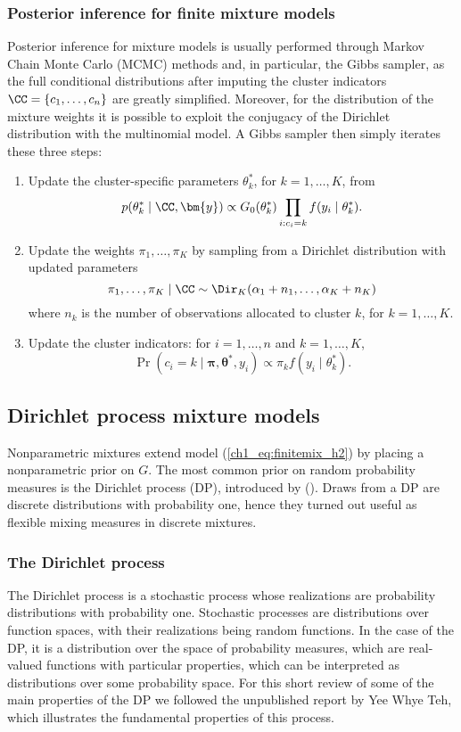 \subsubsection*{Posterior inference for finite mixture models}
Posterior inference for mixture models is usually performed through Markov Chain Monte Carlo (MCMC) methods and, in particular, the Gibbs sampler, as the full conditional distributions after imputing the cluster indicators $\CC = \{c_1,\dots,c_n\}$ are greatly simplified.
Moreover, for the distribution of the mixture weights it is possible to exploit the conjugacy of the Dirichlet distribution with the multinomial model. A Gibbs sampler then simply iterates these three steps:
\begin{enumerate}
	\item Update the cluster-specific parameters $\theta^*_k$, for $k=1,\dots,K$, from
	$$ p(\theta^*_k \mid \CC, \bm{y}) \propto G_0(\theta^*_k) \prod_{i:c_i=k} f(y_i\mid\theta^*_{k}). $$
	\item Update the weights $\pi_1,\dots,\pi_K$ by sampling from a Dirichlet distribution with updated parameters
	$$ \pi_1,\dots,\pi_K\mid \CC \sim  \Dir_K(\alpha_1 + n_1,\dots,\alpha_K + n_K) $$
	where $n_k$ is the number of observations allocated to cluster $k$, for $k=1,\dots,K$.
	\item Update the cluster indicators: for $i=1,\dots,n$ and $k=1,\dots,K$,
	$$ \Pr(c_i = k\mid \bm{\pi},\bm{\theta}^*, y_i) \propto \pi_k f(y_i\mid\theta^*_{k})  .$$
\end{enumerate}



\subsection{Dirichlet process mixture models}
Nonparametric mixtures extend model (\ref{ch1_eq:finitemix_h2}) by placing a nonparametric prior on $G$. The most common prior on random probability measures is the Dirichlet process (DP), introduced by \citeauthor{ferguson1973} (\citeyear{ferguson1973, ferguson1974}). Draws from a DP are discrete distributions with probability one, hence they turned out useful as flexible mixing measures in discrete mixtures.

\subsubsection*{The Dirichlet process }
\label{ch1_sec:DP}
The Dirichlet process is a stochastic process whose realizations are probability distributions with probability one. 
Stochastic processes are distributions over function spaces, with their realizations being random functions. In the case of the DP, it is a distribution over the space of probability measures, which are real-valued functions with particular properties, which can be interpreted as distributions over some probability space. For this short review of some of the main properties of the DP we followed the unpublished report by Yee Whye Teh, which illustrates the fundamental properties of this process.

